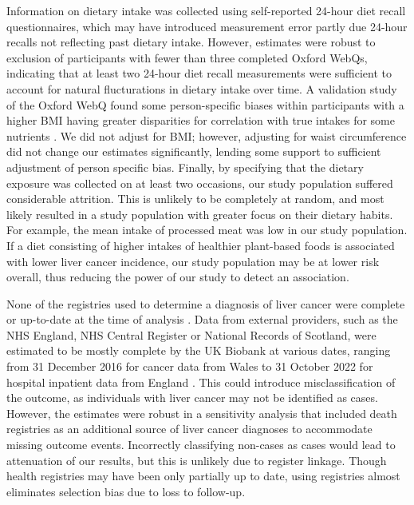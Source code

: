 \documentclass[nutrients,article,submit,moreauthors,pdftex]{Definitions/mdpi}
\begin{document}
Information on dietary intake was collected using self-reported 24-hour
diet recall questionnaires, which may have introduced measurement error
partly due 24-hour recalls not reflecting past dietary intake. However,
estimates were robust to exclusion of participants with fewer than three
completed Oxford WebQs, indicating that at least two 24-hour diet recall
measurements were sufficient to account for natural flucturations in
dietary intake over time. A validation study of the Oxford WebQ found
some person-specific biases within participants with a higher BMI having
greater disparities for correlation with true intakes for some nutrients
\citep{Greenwood2019}. We did not adjust for BMI; however, adjusting for
waist circumference did not change our estimates significantly, lending
some support to sufficient adjustment of person specific bias. Finally,
by specifying that the dietary exposure was collected on at least two
occasions, our study population suffered considerable attrition. This is
unlikely to be completely at random, and most likely resulted in a study
population with greater focus on their dietary habits. For example, the
mean intake of processed meat was low in our study population. If a diet
consisting of higher intakes of healthier plant-based foods is
associated with lower liver cancer incidence, our study population may
be at lower risk overall, thus reducing the power of our study to detect
an association.

None of the registries used to determine a diagnosis of liver cancer
were complete or up-to-date at the time of analysis \citep{RN112}. Data from
external providers, such as the NHS England, NHS Central Register or
National Records of Scotland, were estimated to be mostly complete by
the UK Biobank at various dates, ranging from 31 December 2016 for
cancer data from Wales to 31 October 2022 for hospital inpatient data
from England \citep{RN114}. This could introduce misclassification of the
outcome, as individuals with liver cancer may not be identified as
cases. However, the estimates were robust in a sensitivity analysis that
included death registries as an additional source of liver cancer
diagnoses to accommodate missing outcome events. Incorrectly classifying
non-cases as cases would lead to attenuation of our results, but this is
unlikely due to register linkage. Though health registries may have been
only partially up to date, using registries almost eliminates selection
bias due to loss to follow-up.
\end{document}
